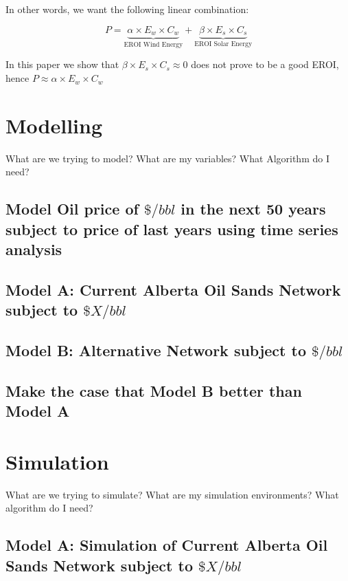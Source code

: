 \documentclass[12pt]{article}
\begin{document}
In other words, we want the following linear combination:

\begin{displaymath}
P = \underbrace{\alpha \times E_w \times C_w}_\text{EROI Wind Energy} + \underbrace{ \beta \times E_s \times C_s}_\text{EROI Solar Energy}
\end{displaymath}

In this paper we show that $\beta \times E_s \times C_s \approx 0$ does not prove to be a good EROI, hence $P \approx \alpha \times E_w \times C_w $\\


\section{Modelling}

What are we trying to model? What are my variables? What Algorithm do I need?
\subsection{Model Oil price of $\$/bbl$ in the next 50 years subject to price of last years using time series analysis}
\subsection{Model A: Current Alberta Oil Sands Network subject to $\$X/bbl$}
\subsection{Model B: Alternative Network subject to $\$/bbl$}
\subsection{Make the case that Model B better than Model A}

\section{Simulation}
What are we trying to simulate? What are my simulation environments? What algorithm do I need?

\subsection{Model A: Simulation of Current Alberta Oil Sands Network subject to $\$X/bbl$}
\end{document}

